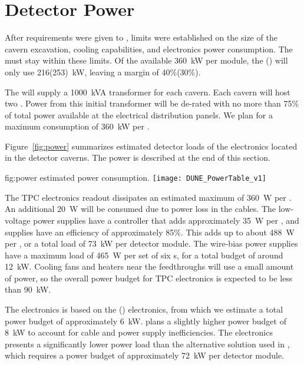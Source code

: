 \section{Detector Power}
\label{sec:fdsp-coord-faci-power}

After requirements were given to , 
limits were established on the size of the cavern excavation, cooling
capabilities, and electronics power consumption.   
The    must stay within these limits. Of the available 360~kW per module, the  () will only use
216(253)~kW,  %
leaving a margin of 40\%(30\%).

The  will supply a 1000~kVA transformer for
each cavern.  Each cavern will host two   .  Power from
this initial transformer will be de-rated with no more than 75\%
of total power available at the electrical distribution panels.  We
plan for a maximum consumption of 360~kW per  .

Figure~\ref{fig:power} summarizes estimated detector loads of the 
 electronics located in the detector caverns.  The  power is 
described at the end of this section. 
\begin{dunefigure}
{fig:power}
{ estimated power consumption.}
  \texttt{[image: DUNE\_PowerTable\_v1]}
\end{dunefigure}


The TPC electronics readout dissipates an estimated maximum of \SI{360}{W}
per . An additional \SI{20}{W} will be consumed due to power loss in the
cables.  The low-voltage power supplies have a controller that adds
approximately \SI{35}{W} per , and supplies have an efficiency of
approximately 85\%. This adds up to about \SI{488}{W} per , or a
total load of  \SI{73}{kW} per detector module. The  wire-bias power
supplies have a maximum load of \SI{465}{W} per set of six s, for a total
budget of around \SI{12}{kW}. Cooling fans and heaters near the feedthroughs
will use a %
small amount of power, so the overall power budget for
TPC electronics is expected to be less than \SI{90}{kW}.

The  electronics is based on the 
    () electronics, from which we estimate a total power
    budget of approximately 6~kW.  plans a slightly higher
    power budget of 8~kW to account for cable and power supply
    inefficiencies.  The  electronics presents a significantly
    lower power load than the  alternative solution used in 
    , which requires a power budget of approximately 72~kW per 
    detector module.


